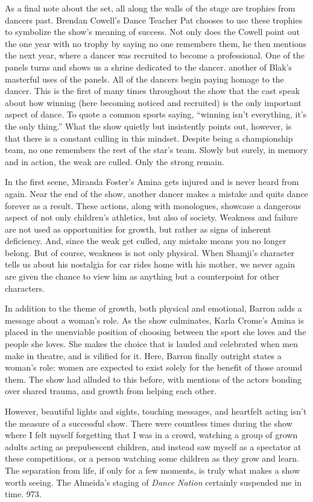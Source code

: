 \documentclass[12pt]{article}[titlepage]
\newcommand{\say}[1]{``#1''}
\newcommand{\1}{\={a}}
\newcommand{\2}{\={e}}
\newcommand{\3}{\={\i}}
\newcommand{\4}{\=o}
\newcommand{\5}{\=u}
\newcommand{\6}{\={A}}
\renewcommand{\,}{\textsuperscript{,}}
\begin{document}
As a final note about the set, all along the walls of the stage are trophies from dancers past.
Brendan Cowell's Dance Teacher Pat chooses to use these trophies to symbolize the show's meaning of success.
Not only does the Cowell point out the one year with no trophy by saying no one remembers them, he then mentions the next year, where a dancer was recruited to become a professional.
One of the panels turns and shows us a shrine dedicated to the dancer. another of Blak's masterful uses of the panels.
All of the dancers begin paying homage to the dancer.
This is the first of many times throughout the show that the cast speak about how winning (here becoming noticed and recruited) is the only important aspect of dance.
To quote a common sports saying, \say{winning isn't everything, it's the only thing.}
What the show quietly but insistently points out, however, is that there is a constant culling in this mindset.
Despite being a championship team, no one remembers the rest of the star's team.
Slowly but surely, in memory and in action, the weak are culled.
Only the strong remain.

In the first scene, Miranda Foster's Amina gets injured and is never heard from again.
Near the end of the show, another dancer makes a mistake and quits dance forever as a result.
These actions, along with monologues, showcase a dangerous aspect of not only children's athletics, but also of society.
Weakness and failure are not used as opportunities for growth, but rather as signs of inherent deficiency.
And, since the weak get culled, any mistake means you no longer belong.
But of course, weakness is not only physical.
When Shamji's character tells us about his nostalgia for car rides home with his mother, we never again are given the chance to view him as anything but a counterpoint for other characters.

In addition to the theme of growth, both physical and emotional, Barron adds a message about a woman's role.
As the show culminates, Karla Crome's Amina is placed in the unenviable position of choosing between the sport she loves and the people she loves.
She makes the choice that is lauded and celebrated when men make in theatre, and is vilified for it.
Here, Barron finally outright states a woman's role: women are expected to exist solely for the benefit of those around them.
The show had alluded to this before, with mentions of the actors bonding over shared trauma, and growth from helping each other.

However, beautiful lights and sights, touching messages, and heartfelt acting isn't the measure of a successful show.
There were countless times during the show where I felt myself forgetting that I was in a crowd, watching a group of grown adults acting as prepubescent children, and instead saw myself as a spectator at these competitions, or a person watching some children as they grow and learn.
The separation from life, if only for a few moments, is truly what makes a show worth seeing.
The Almeida's staging of \textit{Dance Nation} certainly suspended me in time.
973.
\end{document}
